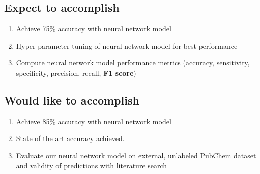 \documentclass{article}
\begin{document}
\subsection{Expect to accomplish}

\begin{enumerate}
    \item Achieve 75\% accuracy with neural network model
    \item Hyper-parameter tuning of neural network model for best performance
    \item Compute neural network model performance metrics (accuracy, sensitivity, specificity, precision, recall, \textbf{F1 score})
\end{enumerate}

\subsection{Would like to accomplish}

\begin{enumerate}
    \item Achieve 85\% accuracy with neural network model
    \item State of the art accuracy achieved.
    \item Evaluate our neural network model on external, unlabeled PubChem dataset and validity of predictions with literature search

\end{enumerate}



\end{document}
